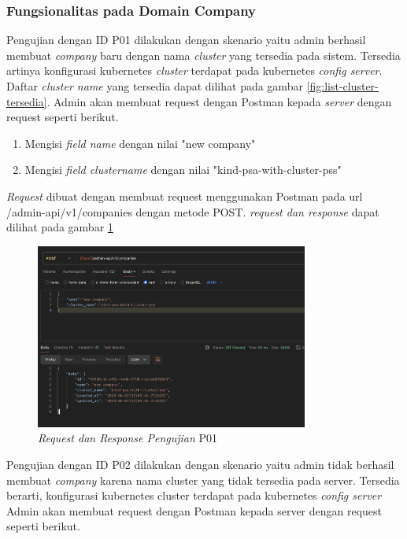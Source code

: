 \subsubsection{Fungsionalitas pada Domain Company}

Pengujian dengan ID P01 dilakukan dengan skenario yaitu admin berhasil membuat \textit{company} baru dengan nama \textit{cluster} yang tersedia pada sistem. Tersedia artinya konfigurasi kubernetes \textit{cluster} terdapat pada kubernetes \textit{config server}. Daftar \textit{cluster name} yang tersedia dapat dilihat pada gambar \ref{fig:list-cluster-tersedia}. Admin akan membuat request dengan Postman kepada \textit{server} dengan request seperti berikut.

\begin{enumerate}
  \item Mengisi \textit{field name} dengan nilai "new company"
  \item Mengisi \textit{field cluster\textunderscore name} dengan nilai "kind-psa-with-cluster-pss"
\end{enumerate}

\textit{Request} dibuat dengan membuat request menggunakan Postman pada url /admin-api/v1/companies dengan metode POST. \textit{request dan response} dapat dilihat pada gambar \ref{fig:pengujian-p01}

\begin{figure}[ht]
  \centering
  \includegraphics[width=0.8\textwidth]{resources/chapter-4/pengujian/p01.jpg}
  \caption{\textit{Request dan Response Pengujian} P01}
  \label{fig:pengujian-p01}
\end{figure}

Pengujian dengan ID P02 dilakukan dengan skenario yaitu admin tidak berhasil membuat \textit{company} karena nama cluster yang tidak tersedia pada server. Tersedia berarti, konfigurasi kubernetes cluster terdapat pada kubernetes \textit{config server} Admin akan membuat request dengan Postman kepada server dengan request seperti berikut.

